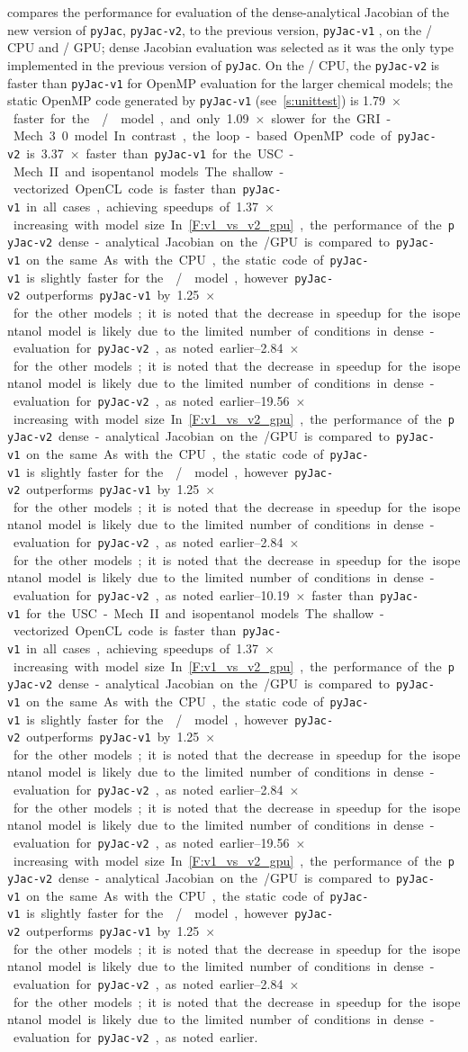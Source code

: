\documentclass[12pt,number,sort&compress,preprint]{elsarticle}
\begin{document}
 compares the performance for evaluation of the dense-analytical Jacobian of the new version of \texttt{pyJac}, \texttt{pyJac-v2}, to the previous version, \texttt{pyJac-v1} \cite{pyjac16}, on the \sse/ CPU and \gpuold/ GPU; dense Jacobian evaluation was selected as it was the only type implemented in the previous version of \texttt{pyJac}.
On the \sse/ CPU, the \texttt{pyJac-v2} is faster than \texttt{pyJac-v1} for OpenMP evaluation for the larger chemical models; the static OpenMP code generated by \texttt{pyJac-v1} (see~\cref{s:unittest}) is \SI{1.79}{$\times$} faster for the \slash{} model, and only \SI{1.09}{$\times$} slower for the GRI-Mech 3.0 model.
In contrast, the loop-based OpenMP code of \texttt{pyJac-v2} is \SIrange{3.37}{10.19}{$\times$} faster than \texttt{pyJac-v1} for the USC-Mech II and isopentanol models.
The shallow-vectorized OpenCL code is faster than \texttt{pyJac-v1} in all cases, achieving speedups of \SIrange{1.37}{19.56}{$\times$} increasing with model size.
In~\cref{F:v1_vs_v2_gpu}, the performance of the \texttt{pyJac-v2} dense-analytical Jacobian on the \gpuold/ GPU is compared to \texttt{pyJac-v1} on the same.
As with the CPU, the static code of \texttt{pyJac-v1} is slightly faster for the \slash{} model, however \texttt{pyJac-v2} outperforms \texttt{pyJac-v1} by \SIrange{1.25}{2.84}{$\times$} for the other models; it is noted that the decrease in speedup for the isopentanol model is likely due to the limited number of conditions in dense-evaluation for \texttt{pyJac-v2}, as noted earlier.
\end{document}
